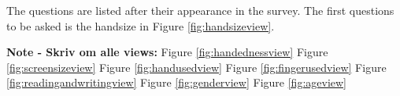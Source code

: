     The questions are listed after their appearance in the survey. The first questions to be asked is the handsize in Figure \ref{fig:handsizeview}. 

    {\bf Note - Skriv om alle views:}
    Figure \ref{fig:handednessview}
    Figure \ref{fig:screensizeview}
    Figure \ref{fig:handusedview}
    Figure \ref{fig:fingerusedview}
    Figure \ref{fig:readingandwritingview}
    Figure \ref{fig:genderview}
    Figure \ref{fig:ageview}

  \clearpage

    \begin{figure}[H]
      \centering
\end{figure}
